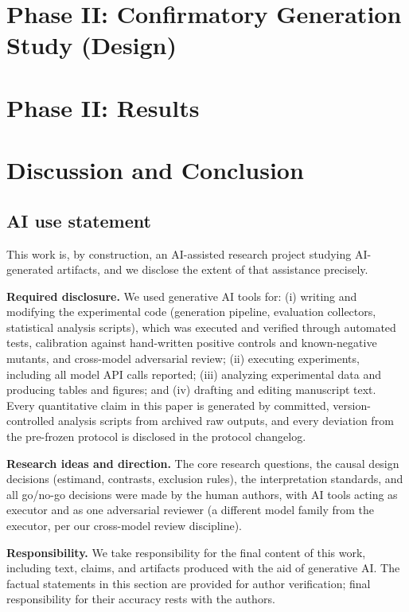 \documentclass{article}
\begin{document}
\section{Phase II: Confirmatory Generation Study (Design)}\label{sec:phase2}


\section{Phase II: Results}\label{sec:results}


\section{Discussion and Conclusion}\label{sec:discussion}




\label{endofmain}

\subsection*{AI use statement}

This work is, by construction, an AI-assisted research project studying
AI-generated artifacts, and we disclose the extent of that assistance precisely.

\textbf{Required disclosure.} We used generative AI tools for: (i) writing and
modifying the experimental code (generation pipeline, evaluation collectors,
statistical analysis scripts), which was executed and verified through automated
tests, calibration against hand-written positive controls and known-negative
mutants, and cross-model adversarial review; (ii) executing experiments,
including all model API calls reported; (iii) analyzing experimental data and
producing tables and figures; and (iv) drafting and editing manuscript text.
Every quantitative claim in this paper is generated by committed,
version-controlled analysis scripts from archived raw outputs, and every
deviation from the pre-frozen protocol is disclosed in the protocol changelog.

\textbf{Research ideas and direction.} The core research questions, the causal
design decisions (estimand, contrasts, exclusion rules), the interpretation
standards, and all go/no-go decisions were made by the human authors, with AI
tools acting as executor and as one adversarial reviewer (a different model
family from the executor, per our cross-model review discipline).

\textbf{Responsibility.} We take responsibility for the final content of this
work, including text, claims, and artifacts produced with the aid of generative
AI. The factual statements in this section are provided for author verification;
final responsibility for their accuracy rests with the authors.




\appendix

\end{document}
